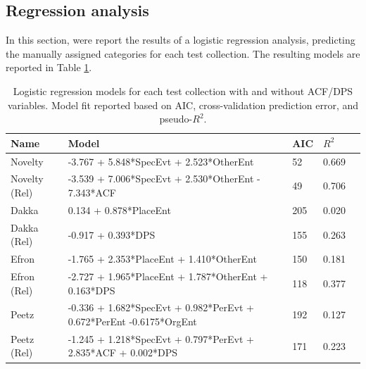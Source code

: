 \documentclass[runningheads,a4paper]{llncs}
\begin{document}
\subsection{Regression analysis}

In this section, were report the results of a logistic regression analysis, predicting the manually assigned categories for each test collection. The resulting models are reported in Table \ref{table.regresults}. 

\begin{table}
\small
\begin{tabular}{| l | l | l | l | l |} \hline
\bf{Name} & \bf{Model} & \bf{AIC} & \bf{$R^2$} \\ \hline
Novelty 	&  -3.767 + 5.848*SpecEvt + 2.523*OtherEnt & 52 & 0.669 \\ \hline
Novelty (Rel)		&  -3.539 + 7.006*SpecEvt + 2.530*OtherEnt - 7.343*ACF & 49 & 0.706 \\ \hline
Dakka	&  0.134 + 0.878*PlaceEnt  & 205 & 0.020 \\ \hline
Dakka (Rel) 		& -0.917 + 0.393*DPS 	& 155 & 0.263  \\ \hline
Efron	& -1.765 + 2.353*PlaceEnt + 1.410*OtherEnt & 150 & 0.181 \\ \hline
Efron (Rel) 		& -2.727 + 1.965*PlaceEnt + 1.787*OtherEnt  + 0.163*DPS & 118 & 0.377 \\ \hline
Peetz & -0.336 + 1.682*SpecEvt + 0.982*PerEvt + 0.672*PerEnt -0.6175*OrgEnt & 192 & 0.127 \\ \hline
Peetz (Rel) 		& -1.245 + 1.218*SpecEvt + 0.797*PerEvt + 2.835*ACF + 0.002*DPS & 171 & 0.223 \\ \hline
\end{tabular}
\label{table.regresults}
\caption{Logistic regression models for each test collection with and without ACF/DPS variables. Model fit reported based on AIC, cross-validation prediction error, and pseudo-$R^2$.}
\end{table}
\end{document}
